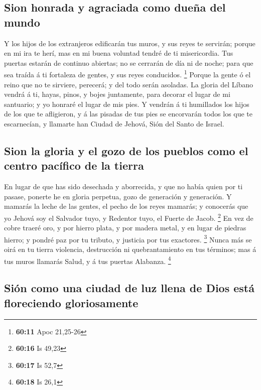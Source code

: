 \hypertarget{sion-honrada-y-agraciada-como-dueuxf1a-del-mundo}{%
\subsection{Sion honrada y agraciada como dueña del
mundo}\label{sion-honrada-y-agraciada-como-dueuxf1a-del-mundo}}

 Y los hijos de los extranjeros edificarán tus muros, y
sus reyes te servirán; porque en mi ira te herí, mas en mi buena
voluntad tendré de ti misericordia.  Tus puertas estarán
de continuo abiertas; no se cerrarán de día ni de noche; para que sea
traída á ti fortaleza de gentes, y sus reyes conducidos. \footnote{\textbf{60:11}
  Apoc 21,25-26}  Porque la gente ó el reino que no te
sirviere, perecerá; y del todo serán asoladas.  La gloria
del Líbano vendrá á ti, hayas, pinos, y bojes juntamente, para decorar
el lugar de mi santuario; y yo honraré el lugar de mis pies.
 Y vendrán á ti humillados los hijos de los que te
afligieron, y á las pisadas de tus pies se encorvarán todos los que te
escarnecían, y llamarte han Ciudad de Jehová, Sión del Santo de Israel.

\hypertarget{sion-la-gloria-y-el-gozo-de-los-pueblos-como-el-centro-pacuxedfico-de-la-tierra}{%
\subsection{Sion la gloria y el gozo de los pueblos como el centro
pacífico de la
tierra}\label{sion-la-gloria-y-el-gozo-de-los-pueblos-como-el-centro-pacuxedfico-de-la-tierra}}

 En lugar de que has sido desechada y aborrecida, y que
no había quien por ti pasase, ponerte he en gloria perpetua, gozo de
generación y generación.  Y mamarás la leche de las
gentes, el pecho de los reyes mamarás; y conocerás que yo Jehová soy el
Salvador tuyo, y Redentor tuyo, el Fuerte de Jacob. \footnote{\textbf{60:16}
  Is 49,23}  En vez de cobre traeré oro, y por hierro
plata, y por madera metal, y en lugar de piedras hierro; y pondré paz
por tu tributo, y justicia por tus exactores. \footnote{\textbf{60:17}
  Is 52,7}  Nunca más se oirá en tu tierra violencia,
destrucción ni quebrantamiento en tus términos; mas á tus muros llamarás
Salud, y á tus puertas Alabanza. \footnote{\textbf{60:18} Is 26,1}

\hypertarget{siuxf3n-como-una-ciudad-de-luz-llena-de-dios-estuxe1-floreciendo-gloriosamente}{%
\subsection{Sión como una ciudad de luz llena de Dios está floreciendo
gloriosamente}\label{siuxf3n-como-una-ciudad-de-luz-llena-de-dios-estuxe1-floreciendo-gloriosamente}}

